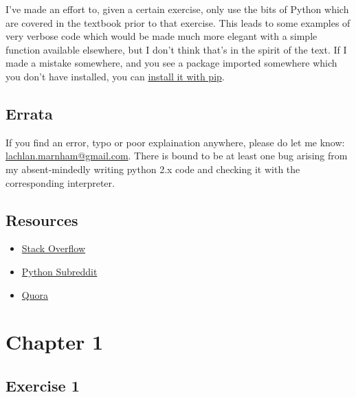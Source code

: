 \documentclass{report}
\begin{document}
I've made an effort to, given a certain exercise, only use the bits of Python which are covered in the textbook prior to that 
exercise. This leads to some examples of very verbose code which would be made much more elegant with a simple function 
available elsewhere, but I don't think that's in the spirit of the text. If I made a mistake somewhere, and you see a package 
imported somewhere which you don't have installed, you can \href{https://pypi.python.org/pypi/pip}{install it with pip}.

\section*{Errata}
If you find an error, typo or poor explaination anywhere, please do let me know: 
\href{lachlan.marnham@gmail.com}{lachlan.marnham@gmail.com}. There is bound to be at least one bug arising from my absent-mindedly 
writing python 2.x code and checking it with the corresponding interpreter.

\section*{Resources}
\begin{itemize}
\item \href{https://www.stackoverflow.com}{Stack Overflow} 
\item \href{https://www.reddit.com/r/Python/}{Python Subreddit}
\item \href{https://www.quora.com}{Quora}
\end{itemize}
\chapter*{Chapter 1} %

\section*{Exercise 1}
 
\end{document}
